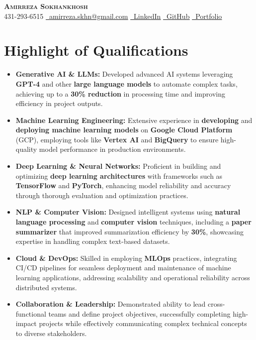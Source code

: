 \documentclass[letterpaper,11pt]{article}
\newcommand{\resumeItem}[1]{
  \item\small{
    #1 \vspace{0pt}
  }
}
\newcommand{\resumeItemListStart}{\begin{itemize}}
\newcommand{\resumeItemListEnd}{\end{itemize}\vspace{-5pt}}
\begin{document}


\begin{center}
    \textbf{\Huge \scshape Amirreza Sokhankhosh} \\ \vspace{1pt}
    \faPhone \small 431-293-6515 \quad
    \href{mailto:amirreza.skhn@gmail.com}{\faEnvelope \ \underline{amirreza.skhn@gmail.com}} \quad
    \href{https://www.linkedin.com/in/amirrezakh/}{\faLinkedin \ \underline{LinkedIn}} \quad
    \href{https://github.com/amirrezaskh}{\faGithub \ \underline{GitHub}} \quad
    \href{https://amirrezaskh.com}{\faBriefcase \ \underline{Portfolio}}
\end{center}

\section{Highlight of Qualifications}
\resumeItemListStart
\resumeItem{\textbf{Generative AI \& LLMs:} Developed advanced AI systems leveraging \textbf{GPT-4} and other \textbf{large language models} to automate complex tasks, achieving up to a \textbf{30\% reduction} in processing time and improving efficiency in project outputs.}
\resumeItem{\textbf{Machine Learning Engineering:} Extensive experience in \textbf{developing} and \textbf{deploying machine learning models} on \textbf{Google Cloud Platform} (GCP), employing tools like \textbf{Vertex AI} and \textbf{BigQuery} to ensure high-quality model performance in production environments.}
\resumeItem{\textbf{Deep Learning \& Neural Networks:} Proficient in building and optimizing \textbf{deep learning architectures} with frameworks such as \textbf{TensorFlow} and \textbf{PyTorch}, enhancing model reliability and accuracy through thorough evaluation and optimization practices.}
\resumeItem{\textbf{NLP \& Computer Vision:} Designed intelligent systems using \textbf{natural language processing} and \textbf{computer vision} techniques, including a \textbf{paper summarizer} that improved summarization efficiency by \textbf{30\%}, showcasing expertise in handling complex text-based datasets.}
\resumeItem{\textbf{Cloud \& DevOps:} Skilled in employing \textbf{MLOps} practices, integrating CI/CD pipelines for seamless deployment and maintenance of machine learning applications, addressing scalability and operational reliability across distributed systems.}
\resumeItem{\textbf{Collaboration \& Leadership:} Demonstrated ability to lead cross-functional teams and define project objectives, successfully completing high-impact projects while effectively communicating complex technical concepts to diverse stakeholders.}
\resumeItemListEnd
\end{document}
